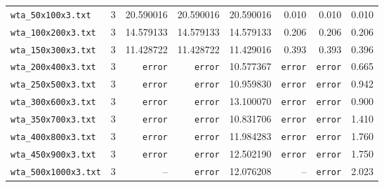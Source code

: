 \begin{longtable}{@{}lrrrrrrr@{}}
\texttt{wta\_50x100x3.txt} & 3 & 20.590016 & 20.590016 & 20.590016 & 0.010 & 0.010 & 0.010 \\
\texttt{wta\_100x200x3.txt} & 3 & 14.579133 & 14.579133 & 14.579133 & 0.206 & 0.206 & 0.206 \\
\texttt{wta\_150x300x3.txt} & 3 & 11.428722 & 11.428722 & 11.429016 & 0.393 & 0.393 & 0.396 \\
\texttt{wta\_200x400x3.txt} & 3 & \texttt{error} & \texttt{error} & 10.577367 & \texttt{error} & \texttt{error} & 0.665 \\
\texttt{wta\_250x500x3.txt} & 3 & \texttt{error} & \texttt{error} & 10.959830 & \texttt{error} & \texttt{error} & 0.942 \\
\texttt{wta\_300x600x3.txt} & 3 & \texttt{error} & \texttt{error} & 13.100070 & \texttt{error} & \texttt{error} & 0.900 \\
\texttt{wta\_350x700x3.txt} & 3 & \texttt{error} & \texttt{error} & 10.831706 & \texttt{error} & \texttt{error} & 1.410 \\
\texttt{wta\_400x800x3.txt} & 3 & \texttt{error} & \texttt{error} & 11.984283 & \texttt{error} & \texttt{error} & 1.760 \\
\texttt{wta\_450x900x3.txt} & 3 & \texttt{error} & \texttt{error} & 12.502190 & \texttt{error} & \texttt{error} & 1.750 \\
\texttt{wta\_500x1000x3.txt} & 3 & -- & \texttt{error} & 12.076208 & -- & \texttt{error} & 2.023 \\
\end{longtable}